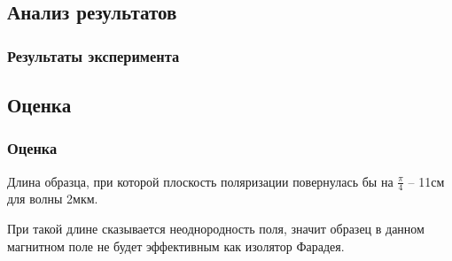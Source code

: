 \documentclass[10pt,pdf,hyperref={unicode}, dvipsnames, handout]{beamer}
\begin{document}
\begin{frame}[t]
	\subsection{Анализ результатов}
	\frametitle{Результаты эксперимента}
	\begin{figure}[tb]
		\centering
		\hspace{5em}
	\end{figure}
	
\end{frame}
\begin{frame}
	\subsection{Оценка}
	\frametitle{Оценка}
	
	Длина образца, при которой плоскость поляризации повернулась бы на $\frac{\pi}{4}$ -- 11см для волны 2мкм. 
	
	При такой длине сказывается неоднородность поля, значит образец в данном магнитном поле не будет эффективным как изолятор Фарадея.
	
\end{frame}
\end{document}
